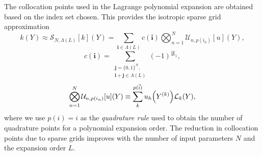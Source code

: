 \documentclass{anstrans}
\begin{document}


The collocation points used in the Lagrange polynomial expansion are obtained based on the index set chosen.
This provides the isotropic sparse grid approximation
\begin{equation}
k(Y)\approx\mathcal{S}_{N,\Lambda(L)}[k](Y)=\sum_{\boldsymbol{i}\in\Lambda(L)}c(\boldsymbol{i})\bigotimes_{n=1}^N\mathcal{U}_{n,p(i_n)}[u](Y),
\end{equation}
\begin{equation}
c(\boldsymbol{i})=\sum_{\substack{\boldsymbol{j}=\{0,1\}^N,\\ \boldsymbol{i}+\boldsymbol{j}\in\Lambda(L)}}(-1)^{|\boldsymbol{j}|_1},
\end{equation}
\begin{equation}
\bigotimes_{n=1}^N\mathcal{U}_{n,p(i_n)}[u](Y)\equiv\sum_{k}^{p(\vec i)}u_h\qty(Y^{(k)})\mathcal{L}_k(Y),
\end{equation}
where we use $p(i)=i$ as the \emph{quadrature rule} used to obtain the number of quadrature points for a polynomial expansion order.
The reduction in collocation points due to sparse grids improves with the number of input parameters $N$ and the expansion order $L$.  
\end{document}
